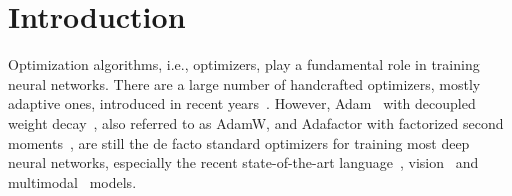\documentclass{article}
\newcommand{\name}{Lion}
\begin{document}
\begin{abstract}



\end{abstract}



\section{Introduction}

Optimization algorithms, i.e., optimizers, play a fundamental role in training neural networks. 
There are a large number of handcrafted optimizers, mostly adaptive ones, introduced in recent years~\citep{zhuang2020adabelief, balles2018msvag, liu2020radam, bernstein2018signsgd, dozat2016nadam, anil2020second}. However, Adam~\citep{kingma2014adam} with decoupled weight decay~\citep{loshchilov2019adamw}, also referred to as AdamW, and Adafactor with factorized second moments~\citep{shazeer2018adafactor}, are still the de facto standard optimizers for training most deep neural networks, especially the recent state-of-the-art language~\citep{brown2020gpt3, vaswani2017attention, devlin2019bert}, vision~\citep{dosovitskiy2021vit, dai2021coatnet, zhai2021scalevit} and multimodal~\citep{radford2021clip, saharia2022imagen, yu2022coca} models. 
\end{document}
